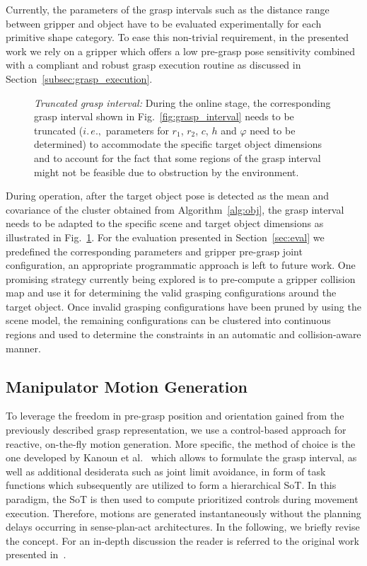 Currently, the parameters of the grasp intervals such as the distance range between gripper and
object have to be evaluated experimentally for each primitive shape category. To ease this
non-trivial requirement, in the presented work we rely on a gripper which offers a low pre-grasp
pose sensitivity combined with a compliant and robust grasp execution routine as discussed in
Section~\ref{subsec:grasp_execution}.
%
\begin{figure}[t!] 
   \centering
     
    \caption{\textit{Truncated grasp interval:} During the online stage, the corresponding grasp
      interval shown in Fig.~\ref{fig:grasp_interval} needs to be truncated ($i.\,e.,$ parameters
      for $r_1$, $r_2$, $c$, $h$ and $\varphi$ need to be determined) to accommodate the specific
      target object dimensions and to account for the fact that some regions of the grasp interval
      might not be feasible due to obstruction by the environment.}
   \label{fig:truncated_grasp_interval}
   \vspace{-0.5cm}
\end{figure}

During operation, after the target object pose is detected as the mean and covariance of the cluster
obtained from Algorithm~\ref{alg:obj}, the grasp interval needs to be adapted to the specific scene
and target object dimensions as illustrated in Fig.~\ref{fig:truncated_grasp_interval}. For the
evaluation presented in Section~\ref{sec:eval} we predefined the corresponding parameters and
gripper pre-grasp joint configuration, an appropriate programmatic approach is left to future work.
One promising strategy currently being explored is to pre-compute a gripper collision map and use it
for determining the valid grasping configurations around the target object. Once invalid grasping
configurations have been pruned by using the scene model, the remaining configurations can be
clustered into continuous regions and used to determine the constraints in an automatic and
collision-aware manner.
%
\subsection{Manipulator Motion Generation}
\label{subsec:manip_motion}
%
To leverage the freedom in pre-grasp position and orientation gained from the previously described
grasp representation, we use a control-based approach for reactive, on-the-fly motion
generation. More specific, the method of choice is the one developed by Kanoun et al.~\cite{Kano11}
which allows to formulate the grasp interval, as well as additional desiderata such as joint limit
avoidance, in form of task functions which subsequently are utilized to form a hierarchical SoT. In
this paradigm, the SoT is then used to compute prioritized controls during movement
execution. Therefore, motions are generated instantaneously without the planning delays occurring in
sense-plan-act architectures. In the following, we briefly revise the concept. For an in-depth
discussion the reader is referred to the original work presented in~\cite{Kano11}.

